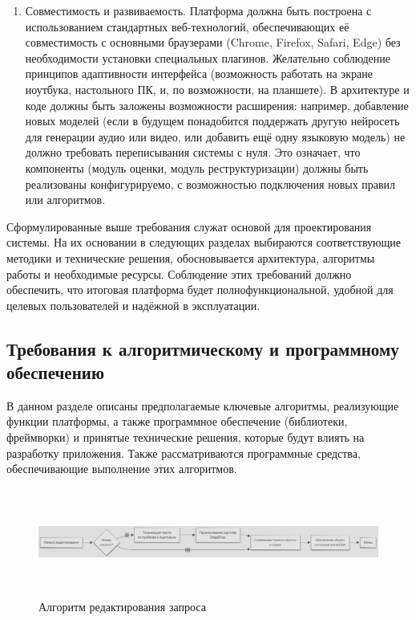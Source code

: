 \begin{enumerate}[label=\arabic*]
    \item Совместимость и развиваемость. Платформа должна быть построена с использованием стандартных веб-технологий, обеспечивающих её совместимость с основными браузерами (Chrome, Firefox, Safari, Edge) без необходимости установки специальных плагинов. Желательно соблюдение принципов адаптивности интерфейса (возможность работать на экране ноутбука, настольного ПК, и, по возможности, на планшете). В архитектуре и коде должны быть заложены возможности расширения: например, добавление новых моделей (если в будущем понадобится поддержать другую нейросеть для генерации аудио или видео, или добавить ещё одну языковую модель) не должно требовать переписывания системы с нуля. Это означает, что компоненты (модуль оценки, модуль реструктуризации) должны быть реализованы конфигурируемо, с возможностью подключения новых правил или алгоритмов.
\end{enumerate}
Сформулированные выше требования служат основой для проектирования системы. На их основании в следующих разделах выбираются соответствующие методики и технические решения, обосновывается архитектура, алгоритмы работы и необходимые ресурсы. Соблюдение этих требований должно обеспечить, что итоговая платформа будет полнофункциональной, удобной для целевых пользователей и надёжной в эксплуатации.
\subsection{Требования к алгоритмическому и программному обеспечению}
В данном разделе описаны предполагаемые ключевые алгоритмы, реализующие функции платформы, а также программное обеспечение (библиотеки, фреймворки) и принятые технические решения, которые будут влиять на разработку приложения. Также рассматриваются программные средства, обеспечивающие выполнение этих алгоритмов.

\begin{figure}[htbp]
    \centering
    \includegraphics[width=1\textwidth, height=100pt]{picture/diploma-inter-algo-1.png}
    \caption{Алгоритм редактирования запроса}
    \label{algo-1}
\end{figure}

